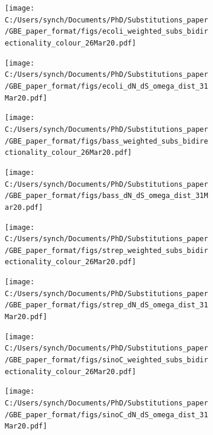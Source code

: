 \documentclass[12pt]{article}
\begin{document}
\begin{figure}
	\centering
	\begin{subfigure}{.5\textwidth}
		\centering
		\texttt{[image: C:/Users/synch/Documents/PhD/Substitutions\_paper/GBE\_paper\_format/figs/ecoli\_weighted\_subs\_bidirectionality\_colour\_26Mar20.pdf]}
		\caption{}
		\label{fig:e1}
	\end{subfigure}%
	\begin{subfigure}{.5\textwidth}
		\centering
		\texttt{[image: C:/Users/synch/Documents/PhD/Substitutions\_paper/GBE\_paper\_format/figs/ecoli\_dN\_dS\_omega\_dist\_31Mar20.pdf]}
		\caption{}
		\label{fig:e2}
	\end{subfigure}
	\label{fig:ecoli}
\end{figure}

\begin{figure}
	\centering
	\begin{subfigure}{.5\textwidth}
		\centering
		\texttt{[image: C:/Users/synch/Documents/PhD/Substitutions\_paper/GBE\_paper\_format/figs/bass\_weighted\_subs\_bidirectionality\_colour\_26Mar20.pdf]}
		\caption{}
		\label{fig:b1}
	\end{subfigure}%
	\begin{subfigure}{.5\textwidth}
		\centering
		\texttt{[image: C:/Users/synch/Documents/PhD/Substitutions\_paper/GBE\_paper\_format/figs/bass\_dN\_dS\_omega\_dist\_31Mar20.pdf]}
		\caption{}
		\label{fig:b2}
	\end{subfigure}
	\label{fig:bass}
\end{figure}

\begin{figure}
	\centering
	\begin{subfigure}{.5\textwidth}
		\centering
		\texttt{[image: C:/Users/synch/Documents/PhD/Substitutions\_paper/GBE\_paper\_format/figs/strep\_weighted\_subs\_bidirectionality\_colour\_26Mar20.pdf]}
		\caption{}
		\label{fig:s1}
	\end{subfigure}%
	\begin{subfigure}{.5\textwidth}
		\centering
		\texttt{[image: C:/Users/synch/Documents/PhD/Substitutions\_paper/GBE\_paper\_format/figs/strep\_dN\_dS\_omega\_dist\_31Mar20.pdf]}
		\caption{}
		\label{fig:s2}
	\end{subfigure}
	\label{fig:strep}
\end{figure}

\begin{figure}
	\centering
	\begin{subfigure}{.5\textwidth}
		\centering
		\texttt{[image: C:/Users/synch/Documents/PhD/Substitutions\_paper/GBE\_paper\_format/figs/sinoC\_weighted\_subs\_bidirectionality\_colour\_26Mar20.pdf]}
		\caption{}
		\label{fig:sC1}
	\end{subfigure}%
	\begin{subfigure}{.5\textwidth}
		\centering
		\texttt{[image: C:/Users/synch/Documents/PhD/Substitutions\_paper/GBE\_paper\_format/figs/sinoC\_dN\_dS\_omega\_dist\_31Mar20.pdf]}
		\caption{}
		\label{fig:sC2}
	\end{subfigure}
	\label{fig:sinoC}
\end{figure}
\end{document}
